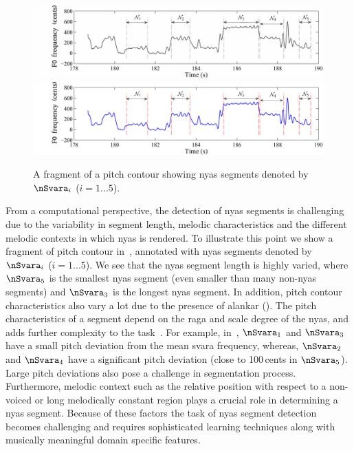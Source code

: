 {\begin{figure}
	\begin{center}
		\ifdefined\PRINTVER
			\includegraphics[width=\figSizeHundred]{ch05_preprocessing/figures/NyasFragmentChallenge_BW.pdf}
		\else
			\includegraphics[width=\figSizeHundred]{ch05_preprocessing/figures/NyasFragmentChallenge.pdf}
		\fi
		
	\end{center}
	\caption[A fragment of a pitch contour showing \gls{nyas} segments]{A fragment of a pitch contour showing \gls{nyas} segments denoted by $\nSvara_i$ ($i={1...5}$).}
	\label{fig:nyas_segments_example}
\end{figure}

From a computational perspective, the detection of \gls{nyas} segments is challenging due to the variability in segment length, melodic characteristics and the different melodic contexts in which \gls{nyas} is rendered. To illustrate this point we show a fragment of pitch contour in~, annotated with \gls{nyas} segments denoted by $\nSvara_i$ ($i={1...5}$). We see that the \gls{nyas} segment length is highly varied, where $\nSvara_5$ is the smallest \gls{nyas} segment (even smaller than many non-\gls{nyas} segments) and $\nSvara_3$ is the longest \gls{nyas} segment. In addition, pitch contour characteristics also vary a lot due to the presence of \gls{alankar} (). The pitch characteristics of a segment depend on the \gls{raga} and scale degree of the \gls{nyas}, and adds further complexity to the task~\citep{Bagchee1998}. For example, in~, $\nSvara_1$ and $\nSvara_3$ have a small pitch deviation from the mean \gls{svara} frequency, whereas, $\nSvara_2$ and $\nSvara_4$ have a significant pitch deviation (close to 100\,cents in $\nSvara_5$). Large pitch deviations also pose a challenge in segmentation process. Furthermore, melodic context such as the relative position with respect to a non-voiced or long melodically constant region plays a crucial role in determining a \gls{nyas} segment. Because of these factors the task of \gls{nyas} segment detection becomes challenging and requires sophisticated learning techniques along with musically meaningful domain specific features.

}
